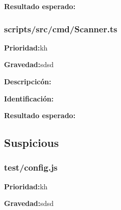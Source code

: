 \documentclass{article}
\begin{document}
        \begingroup
        \noindent
        \leftskip 35pt 
        \rightskip 0pt 
        \vspace{10pt}
        \textbf{Resultado esperado:}
    
        \endgroup
        \subsubsection{scripts/src/cmd/Scanner.ts}
        \begingroup
        \noindent
        \leftskip 35pt 
        \rightskip 0pt 
        \vspace{10pt}
        \textbf{Prioridad:}kh

        \endgroup

        \begingroup
        \noindent
        \leftskip 35pt 
        \rightskip 0pt 
        \vspace{10pt}
        \textbf{Gravedad:}sdsd

        \endgroup
            
        \begingroup
        \noindent
        \leftskip 35pt 
        \rightskip 0pt 
        \vspace{10pt}
        \textbf{Descripcicón:}
    
        \endgroup

        \begingroup
        \noindent
        \leftskip 35pt 
        \rightskip 0pt 
        \vspace{10pt}
        \textbf{Identificación:}
        
        \endgroup

        \begingroup
        \noindent
        \leftskip 35pt 
        \rightskip 0pt 
        \vspace{10pt}
        \textbf{Resultado esperado:}
    
        \endgroup

    \subsection{Suspicious}
        \subsubsection{test/config.js}
        \begingroup
        \noindent
        \leftskip 35pt 
        \rightskip 0pt 
        \vspace{10pt}
        \textbf{Prioridad:}kh

        \endgroup

        \begingroup
        \noindent
        \leftskip 35pt 
        \rightskip 0pt 
        \vspace{10pt}
        \textbf{Gravedad:}sdsd
\end{document}
